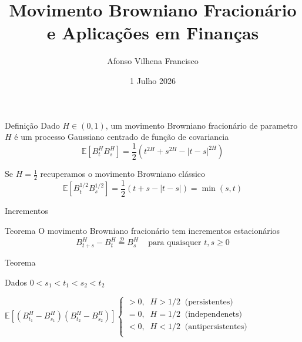 \documentclass{beamer}
\title{Movimento Browniano Fracionário e Aplicações em Finanças}
\author{Afonso Vilhena Francisco }
\date{1 Julho 2026}
\begin{document}
\maketitle

\begin{frame}{}
\begin{block}{Definição}
    Dado $H \in (0,1)$, um movimento Browniano fracionário de parametro $H$ é um processo Gaussiano centrado de função de covariancia
    $$\mathbb{E}[B^H_tB^H_s]= \frac{1}{2}(t^{2H}+s^{2H}-|t-s|^{2H})$$
\end{block}

\pause

\vspace{0.5cm}

Se $H=\frac{1}{2}$ recuperamos o movimento Browniano clássico
$$\mathbb{E}[B^{1/2}_tB^{1/2}_s]= \frac{1}{2}(t+s-|t-s|)=\min (s,t)$$

\end{frame}

\begin{frame}{Incrementos}
    \begin{block}{Teorema}
        O movimento Browniano fracionário tem incrementos estacionários
        $$B_{t+s}^H-B_t^H \overset{\mathcal{D}}{=}B_s^H \;\;\;\text{ para quaisquer } t,s \geq 0$$
    \end{block}
    
    \vspace{0.5cm}

    \pause

    \begin{block}{Teorema}
        
    Dados $0<s_1<t_1<s_2<t_2$

    \vspace{0.3cm}
       
    $\mathbb{E}[(B_{t_1}^H-B_{s_1}^H)(B_{t_2}^H-B_{s_2}^H)] 
    \begin{cases}
        >0,\;\; H>1/2\;\; \text{(persistentes)}\\
        =0,\;\; H=1/2\;\;\text{(independenets)}\\
        <0,\;\; H<1/2\;\; \text{(antipersistentes)}\\
    \end{cases}$

    \end{block}

\end{frame}
\end{document}
